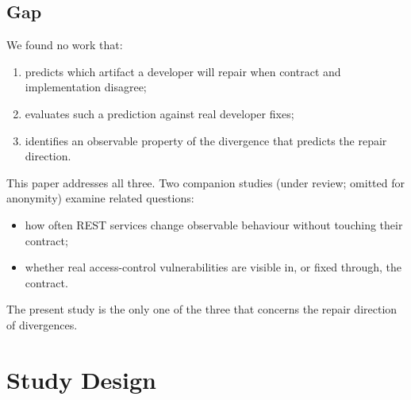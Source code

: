\documentclass[acmsmall,screen,review,anonymous]{acmart}
\begin{document}
\subsection{Gap}
We found no work that:
\begin{enumerate}
\item predicts which artifact a developer will repair when contract and implementation disagree;
\item evaluates such a prediction against real developer fixes;
\item identifies an observable property of the divergence that predicts the repair direction.
\end{enumerate}

This paper addresses all three. Two companion studies (under review; omitted for anonymity) examine related questions:
\begin{itemize}
\item how often REST services change observable behaviour without touching their contract;
\item whether real access-control vulnerabilities are visible in, or fixed through, the contract.
\end{itemize}

The present study is the only one of the three that concerns the repair direction of divergences.

\section{Study Design}
\end{document}
